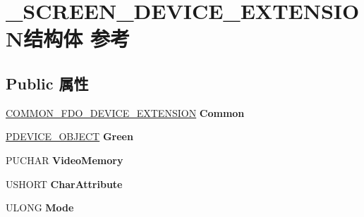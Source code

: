 \hypertarget{struct___s_c_r_e_e_n___d_e_v_i_c_e___e_x_t_e_n_s_i_o_n}{}\section{\+\_\+\+S\+C\+R\+E\+E\+N\+\_\+\+D\+E\+V\+I\+C\+E\+\_\+\+E\+X\+T\+E\+N\+S\+I\+O\+N结构体 参考}
\label{struct___s_c_r_e_e_n___d_e_v_i_c_e___e_x_t_e_n_s_i_o_n}
\subsection*{Public 属性}
\begin{DoxyCompactItemize}
\item 
\mbox{\label{struct___s_c_r_e_e_n___d_e_v_i_c_e___e_x_t_e_n_s_i_o_n_a24881a430a00ddb04d04d8126efdf623}} 
\hyperlink{struct___c_o_m_m_o_n___f_d_o___d_e_v_i_c_e___e_x_t_e_n_s_i_o_n}{C\+O\+M\+M\+O\+N\+\_\+\+F\+D\+O\+\_\+\+D\+E\+V\+I\+C\+E\+\_\+\+E\+X\+T\+E\+N\+S\+I\+ON} {\bfseries Common}
\item 
\mbox{\label{struct___s_c_r_e_e_n___d_e_v_i_c_e___e_x_t_e_n_s_i_o_n_a1a46f09b9752e29799ab3be23e7d35b4}} 
\hyperlink{struct___d_e_v_i_c_e___o_b_j_e_c_t}{P\+D\+E\+V\+I\+C\+E\+\_\+\+O\+B\+J\+E\+CT} {\bfseries Green}
\item 
\mbox{\label{struct___s_c_r_e_e_n___d_e_v_i_c_e___e_x_t_e_n_s_i_o_n_a8b12581739968f393fba9473b0154275}} 
P\+U\+C\+H\+AR {\bfseries Video\+Memory}
\item 
\mbox{\label{struct___s_c_r_e_e_n___d_e_v_i_c_e___e_x_t_e_n_s_i_o_n_a17f1ace67adfe56317b7b806bf0bd316}} 
U\+S\+H\+O\+RT {\bfseries Char\+Attribute}
\item 
\mbox{\label{struct___s_c_r_e_e_n___d_e_v_i_c_e___e_x_t_e_n_s_i_o_n_a77a928486f7da843da5ba8ee21e1cea1}} 
U\+L\+O\+NG {\bfseries Mode}
\item 
\mbox{\label{struct___s_c_r_e_e_n___d_e_v_i_c_e___e_x_t_e_n_s_i_o_n_a8813f5d8834e77c2d289d9772d3002f0}} 

\end{DoxyCompactItemize}

